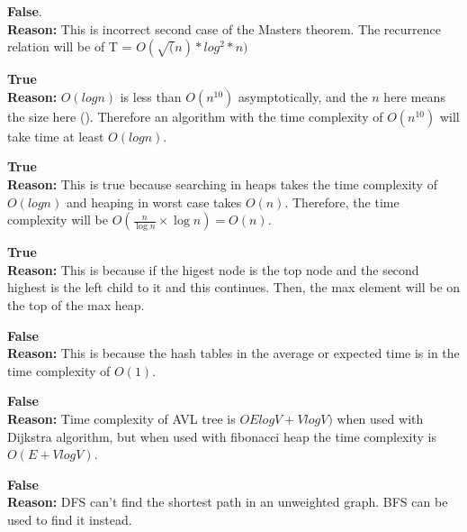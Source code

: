 \documentclass[12pt,twoside]{article}
\begin{document}

\begin{problems}
\problem  %

\begin{problemparts}
\problempart %
\textbf{False}. \\
\textbf{Reason: }This is incorrect second case of the Masters theorem. The recurrence relation will be of T = $O(\sqrt(n) * log^2*{n})$


\problempart %
\textbf{True}\\
\textbf{Reason: } $O(log n)$ is less than $O(n^10)$ asymptotically, and the $n$ here means the size here (). Therefore an algorithm with the time complexity of $O(n^10)$ will take time at least $O(log n)$.


\problempart %
\textbf{True}\\
\textbf{Reason: } This is true because searching in heaps takes the time complexity of $O(logn)$ and heaping in worst case takes $O(n)$. Therefore, the time complexity will be $O({\frac{n}{\log n}} \times \log n) = O(n)$.


\problempart %
\textbf{True}\\
\textbf{Reason: } This is because if the higest node is the top node and the second highest is the left child to it and this continues. Then, the max element will be on the top of the max heap.



\problempart %
\textbf{False}\\
\textbf{Reason: } This is because the hash tables in the average or expected time is in the time complexity of $O(1)$.


\problempart %
\textbf{False} \\
\textbf{Reason: } Time complexity of AVL tree is $OElogV + VlogV)$ when used with Dijkstra algorithm, but when used with fibonacci heap the time complexity is $O(E + VlogV)$.


\problempart %
\textbf{False}\\
\textbf{Reason: } DFS can't find the shortest path in an unweighted graph. BFS can be used to find it instead.



\end{problemparts}
\end{problems}
\end{document}
